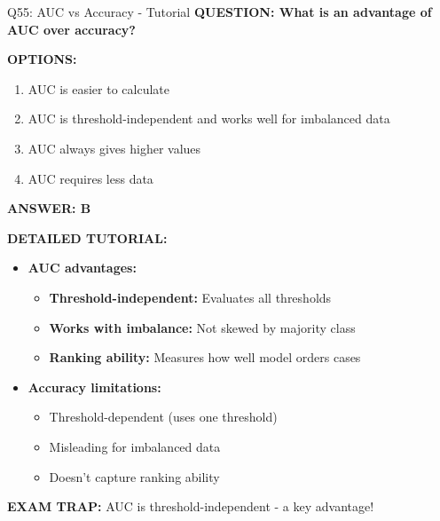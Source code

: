 \documentclass[8pt]{beamer}
\begin{document}
	\begin{frame}{Q55: AUC vs Accuracy - Tutorial}
		\fontsize{6.5}{7.5}\selectfont
		\textbf{QUESTION: What is an advantage of AUC over accuracy?}
		
		\vspace{0.1cm}
		\textbf{OPTIONS:}
		\begin{enumerate}
			\item AUC is easier to calculate
			\item AUC is threshold-independent and works well for imbalanced data
			\item AUC always gives higher values
			\item AUC requires less data
		\end{enumerate}
		
		\vspace{0.1cm}
		\textcolor{myblue}{\textbf{ANSWER: B}}
		
		\vspace{0.1cm}
		\textbf{DETAILED TUTORIAL:}
		\begin{itemize}
			\item \textbf{AUC advantages:}
			\begin{itemize}
				\item \textbf{Threshold-independent:} Evaluates all thresholds
				\item \textbf{Works with imbalance:} Not skewed by majority class
				\item \textbf{Ranking ability:} Measures how well model orders cases
			\end{itemize}
			\item \textbf{Accuracy limitations:}
			\begin{itemize}
				\item Threshold-dependent (uses one threshold)
				\item Misleading for imbalanced data
				\item Doesn't capture ranking ability
			\end{itemize}
		\end{itemize}
		
		\textcolor{myred}{\textbf{EXAM TRAP:}} AUC is \textcolor{myblue}{threshold-independent} - a key advantage!
	\end{frame}
	
	
\end{document}
